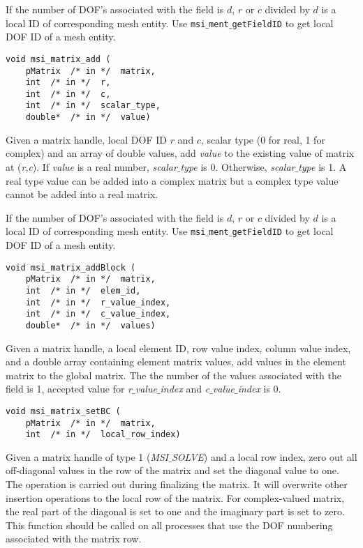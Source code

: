 If the number of DOF's associated with the field is $d$, $r$ or $c$ divided by $d$ is a local ID of corresponding mesh entity. Use \texttt{msi$\_$ment$\_$getFieldID} to get local DOF ID of a mesh entity.

\begin{verbatim}
void msi_matrix_add (
    pMatrix  /* in */  matrix, 
    int  /* in */  r, 
    int  /* in */  c, 
    int  /* in */  scalar_type,
    double*  /* in */  value)
\end{verbatim}\vspace{-.5cm}\hspace{1cm}
Given a matrix handle, local DOF ID $r$ and $c$, scalar type (0 for real, 1 for complex) and an array of double values, add \textit{value} to the existing value of matrix at (\textit{r},\textit{c}). If \textit{value} is a real number, \textit{scalar$\_$type} is 0. Otherwise, \textit{scalar$\_$type} is 1. A real type value can be added into a complex matrix but a complex type value cannot be added into a real matrix.   

If the number of DOF's associated with the field is $d$, $r$ or $c$ divided by $d$ is a local ID of corresponding mesh entity. Use \texttt{msi$\_$ment$\_$getFieldID} to get local DOF ID of a mesh entity.

\begin{verbatim}
void msi_matrix_addBlock (
    pMatrix  /* in */  matrix, 
    int  /* in */  elem_id, 
    int  /* in */  r_value_index, 
    int  /* in */  c_value_index, 
    double*  /* in */  values)
\end{verbatim}\vspace{-.5cm}\hspace{1cm}
Given a matrix handle, a local element ID, row value index, column value index, and a double array containing element matrix values, add values in the element matrix to the global matrix. The the number of the values associated with the field is 1, accepted value for \textit{r$\_$value$\_$index} and \textit{c$\_$value$\_$index} is 0.

 
\begin{verbatim}
void msi_matrix_setBC (
    pMatrix  /* in */  matrix, 
    int  /* in */  local_row_index)
\end{verbatim}\vspace{-.5cm}\hspace{1cm}
Given a matrix handle of type 1 (\textit{MSI$\_$SOLVE}) and a local row index, zero out all off-diagonal values in the row of the matrix and set the diagonal value to one. The operation is carried out during finalizing the matrix. It will overwrite other insertion operations to the local row of the matrix. For complex-valued matrix, the real part of the diagonal is set to one and the imaginary part is set to zero.
This function should be called on all processes that use the DOF numbering associated with the matrix row. 

